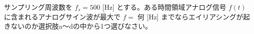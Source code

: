 サンプリング周波数を $f_s = 500$ [Hz] とする。ある時間領域アナログ信号 $f(t)$ に含まれるアナログサイン波が最大で $f=$ 何 [Hz] までならエイリアシングが起きないのか選択肢a〜dの中から1つ選びなさい。
